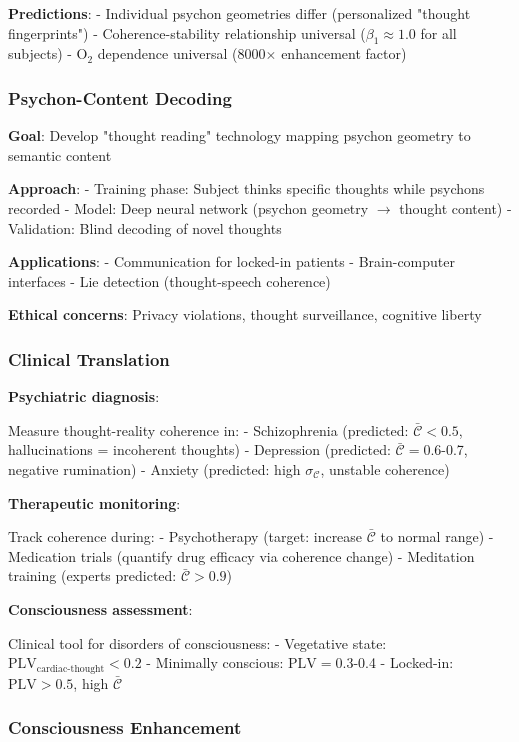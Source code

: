 \documentclass[11pt,onecolumn]{article}
\begin{document}
\textbf{Predictions}:
- Individual psychon geometries differ (personalized "thought fingerprints")
- Coherence-stability relationship universal ($\beta_1 \approx 1.0$ for all subjects)
- O$_2$ dependence universal (8000$\times$ enhancement factor)

\subsubsection{Psychon-Content Decoding}

\textbf{Goal}: Develop "thought reading" technology mapping psychon geometry to semantic content

\textbf{Approach}:
- Training phase: Subject thinks specific thoughts while psychons recorded
- Model: Deep neural network (psychon geometry $\to$ thought content)
- Validation: Blind decoding of novel thoughts

\textbf{Applications}:
- Communication for locked-in patients
- Brain-computer interfaces
- Lie detection (thought-speech coherence)

\textbf{Ethical concerns}: Privacy violations, thought surveillance, cognitive liberty

\subsubsection{Clinical Translation}

\textbf{Psychiatric diagnosis}:

Measure thought-reality coherence in:
- Schizophrenia (predicted: $\bar{\mathcal{C}} < 0.5$, hallucinations = incoherent thoughts)
- Depression (predicted: $\bar{\mathcal{C}} = 0.6$-0.7, negative rumination)
- Anxiety (predicted: high $\sigma_\mathcal{C}$, unstable coherence)

\textbf{Therapeutic monitoring}:

Track coherence during:
- Psychotherapy (target: increase $\bar{\mathcal{C}}$ to normal range)
- Medication trials (quantify drug efficacy via coherence change)
- Meditation training (experts predicted: $\bar{\mathcal{C}} > 0.9$)

\textbf{Consciousness assessment}:

Clinical tool for disorders of consciousness:
- Vegetative state: $\text{PLV}_{\text{cardiac-thought}} < 0.2$
- Minimally conscious: $\text{PLV} = 0.3$-0.4
- Locked-in: $\text{PLV} > 0.5$, high $\bar{\mathcal{C}}$

\subsubsection{Consciousness Enhancement}
\end{document}
